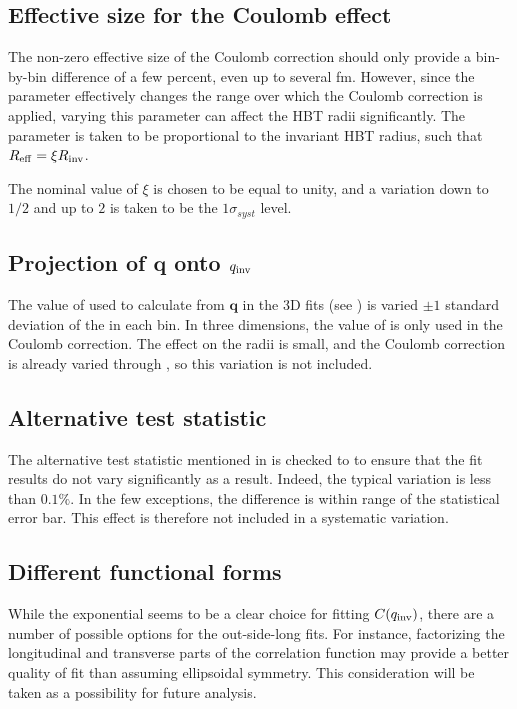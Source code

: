 \subsection{Effective size for the Coulomb effect}
The non-zero effective size of the Coulomb correction \Reff should only provide a bin-by-bin difference of a few percent, even up to several fm.
However, since the parameter effectively changes the \qinv range over which the Coulomb correction is applied, varying this parameter can affect the HBT radii significantly.
The parameter \Reff is taken to be proportional to the invariant HBT radius, such that $R_{\mathrm{eff}} = \xi R_{\mathrm{inv}}$.

The nominal value of $\xi$ is chosen to be equal to unity, and a variation down to $1/2$ and up to $2$ is taken to be the $1\sigma_{syst}$ level.

\subsection{Projection of $\mathbf{q}$ onto $q_{\mathrm{inv}}$}
The value of \kt used to calculate \qinv from $\mathbf{q}$ in the 3D fits (see ) is varied $\pm 1$ standard deviation of the \kt in each bin.
In three dimensions, the value of \qinv is only used in the Coulomb correction.
The effect on the radii is small, and the Coulomb correction is already varied through \Reff, so this variation is not included.


\subsection{Alternative test statistic}
The alternative test statistic mentioned in  is checked to to ensure that the fit results do not vary significantly as a result.
Indeed, the typical variation is less than $0.1\%$.
In the few exceptions, the difference is within range of the statistical error bar.
This effect is therefore not included in a systematic variation.

\subsection{Different functional forms}
While the exponential seems to be a clear choice for fitting $C(q_{\mathrm{inv}})$, there are a number of possible options for the out-side-long fits.
For instance, factorizing the longitudinal and transverse parts of the correlation function may provide a better quality of fit than assuming ellipsoidal symmetry.
This consideration will be taken as a possibility for future analysis.

